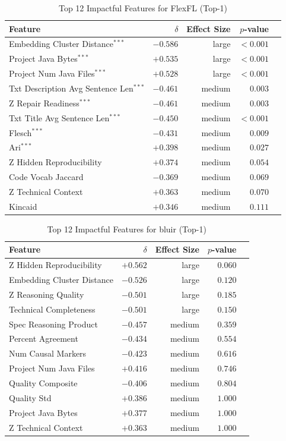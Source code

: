 \begin{table}[h]
\centering
\caption{Top 12 Impactful Features for FlexFL (Top-1)}
\label{tab:tool_features_flexfl_top1}
\begin{tabular}{lrrrr}
\toprule
Feature & $\delta$ & Effect Size & $p$-value \\
\midrule
Embedding Cluster Distance$^{***}$ & $-0.586$ & large & $<0.001$ \\
Project Java Bytes$^{***}$ & $+0.535$ & large & $<0.001$ \\
Project Num Java Files$^{***}$ & $+0.528$ & large & $<0.001$ \\
Txt Description Avg Sentence Len$^{***}$ & $-0.461$ & medium & $0.003$ \\
Z Repair Readiness$^{***}$ & $-0.461$ & medium & $0.003$ \\
Txt Title Avg Sentence Len$^{***}$ & $-0.450$ & medium & $<0.001$ \\
Flesch$^{***}$ & $-0.431$ & medium & $0.009$ \\
Ari$^{***}$ & $+0.398$ & medium & $0.027$ \\
Z Hidden Reproducibility & $+0.374$ & medium & $0.054$ \\
Code Vocab Jaccard & $-0.369$ & medium & $0.069$ \\
Z Technical Context & $+0.363$ & medium & $0.070$ \\
Kincaid & $+0.346$ & medium & $0.111$ \\
\bottomrule
\end{tabular}
\end{table}

\begin{table}[h]
\centering
\caption{Top 12 Impactful Features for bluir (Top-1)}
\label{tab:tool_features_bluir_top1}
\begin{tabular}{lrrrr}
\toprule
Feature & $\delta$ & Effect Size & $p$-value \\
\midrule
Z Hidden Reproducibility & $+0.562$ & large & $0.060$ \\
Embedding Cluster Distance & $-0.526$ & large & $0.120$ \\
Z Reasoning Quality & $-0.501$ & large & $0.185$ \\
Technical Completeness & $-0.501$ & large & $0.150$ \\
Spec Reasoning Product & $-0.457$ & medium & $0.359$ \\
Percent Agreement & $-0.434$ & medium & $0.554$ \\
Num Causal Markers & $-0.423$ & medium & $0.616$ \\
Project Num Java Files & $+0.416$ & medium & $0.746$ \\
Quality Composite & $-0.406$ & medium & $0.804$ \\
Quality Std & $+0.386$ & medium & $1.000$ \\
Project Java Bytes & $+0.377$ & medium & $1.000$ \\
Z Technical Context & $+0.363$ & medium & $1.000$ \\
\bottomrule
\end{tabular}
\end{table}

